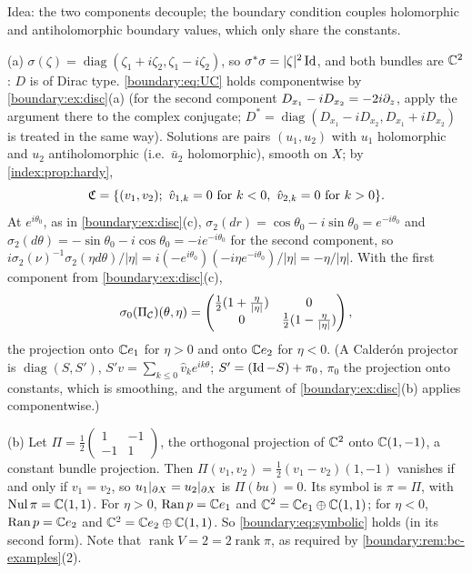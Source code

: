 \subsection*{}
Idea: the two components decouple; the boundary condition couples holomorphic and
antiholomorphic boundary values, which only share the constants.

(a) $\sigma(\zeta)=\operatorname{diag}(\zeta_1+i\zeta_2,\zeta_1-i\zeta_2)$, so
$\sigma^*\sigma=|\zeta|^2\operatorname{Id}$, and both bundles are $\mathbb{C}^2$: $D$ is of Dirac type.
\eqref{boundary:eq:UC} holds componentwise by \cref{boundary:ex:disc}(a) (for the second
component $D_{x_1}-iD_{x_2}=-2i\partial_z$, apply the argument there to the complex conjugate;
$D^*=\operatorname{diag}(D_{x_1}-iD_{x_2},D_{x_1}+iD_{x_2})$ is treated in the same way).
Solutions are pairs $(u_1,u_2)$ with $u_1$ holomorphic and $u_2$ antiholomorphic (i.e.\
$\bar u_2$ holomorphic), smooth on $X$; by \cref{index:prop:hardy},
\begin{equation*}
\Cau=\{(v_1,v_2);\ \hat v_{1,k}=0\ \text{for}\ k<0,\ \hat v_{2,k}=0\ \text{for}\ k>0\}.
\end{equation*}
At $e^{i\theta_0}$, as in \cref{boundary:ex:disc}(c), $\sigma_2(dr)=\cos\theta_0-i
\sin\theta_0=e^{-i\theta_0}$ and $\sigma_2(d\theta)=-\sin\theta_0-i\cos\theta_0=-ie^{-i
\theta_0}$ for the second component, so $i\sigma_2(\nu)^{-1}\sigma_2(\eta d\theta)/|\eta|=
i(-e^{i\theta_0})(-i\eta e^{-i\theta_0})/|\eta|=-\eta/|\eta|$. With the first component
from \cref{boundary:ex:disc}(c),
\begin{equation*}
\sigma_0(\Pi_{\mathcal{C}})(\theta,\eta)=\begin{pmatrix}\frac12(1+\frac\eta{|\eta|})&0\\0&\frac12(1-\frac\eta
{|\eta|})\end{pmatrix},
\end{equation*}
the projection onto $\mathbb{C} e_1$ for $\eta>0$ and onto $\mathbb{C} e_2$ for $\eta<0$. (A Calder\'on
projector is $\operatorname{diag}(S,S')$, $S'v=\sum_{k\le0}\hat v_ke^{ik\theta}$;
$S'=(\operatorname{Id}-S)+\pi_0$, $\pi_0$ the projection onto constants, which is smoothing, and the
argument of \cref{boundary:ex:disc}(b) applies componentwise.)

(b) Let $\Pi=\frac12\begin{pmatrix}1&-1\\-1&1\end{pmatrix}$, the orthogonal projection of
$\mathbb{C}^2$ onto $\mathbb{C}(1,-1)$, a constant bundle projection. Then $\Pi(v_1,v_2)=\frac12(v_1-v_2)
(1,-1)$ vanishes if and only if $v_1=v_2$, so $u_1|_{\partial X}=u_2|_{\partial X}$ is $\Pi(bu)=0$.
Its symbol is $\pi=\Pi$, with $\operatorname{Nul}\pi=\mathbb{C}(1,1)$. For $\eta>0$, $\operatorname{Ran} p=\mathbb{C} e_1$ and
$\mathbb{C}^2=\mathbb{C} e_1\oplus\mathbb{C}(1,1)$; for $\eta<0$, $\operatorname{Ran} p=\mathbb{C} e_2$ and $\mathbb{C}^2=\mathbb{C} e_2\oplus\mathbb{C}(1,1)$.
So \eqref{boundary:eq:symbolic} holds (in its second form). Note that $\operatorname{rank}
V=2=2\operatorname{rank}\pi$, as required by \cref{boundary:rem:bc-examples}(2).

